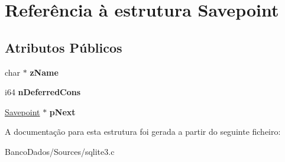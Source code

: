 \hypertarget{struct_savepoint}{\section{Referência à estrutura Savepoint}
\label{struct_savepoint}
}
\subsection*{Atributos Públicos}
\begin{DoxyCompactItemize}
\item 
\hypertarget{struct_savepoint_a0ba08ea77fcfd93099288375e2e9b1ec}{char $\ast$ {\bfseries z\-Name}}\label{struct_savepoint_a0ba08ea77fcfd93099288375e2e9b1ec}

\item 
\hypertarget{struct_savepoint_ae00dd8f725701d9e31da2edbb0b27435}{i64 {\bfseries n\-Deferred\-Cons}}\label{struct_savepoint_ae00dd8f725701d9e31da2edbb0b27435}

\item 
\hypertarget{struct_savepoint_a8d785c3c0eeb6f0c62ea5391892c78cb}{\hyperlink{struct_savepoint}{Savepoint} $\ast$ {\bfseries p\-Next}}\label{struct_savepoint_a8d785c3c0eeb6f0c62ea5391892c78cb}

\end{DoxyCompactItemize}


A documentação para esta estrutura foi gerada a partir do seguinte ficheiro\-:\begin{DoxyCompactItemize}
\item 
Banco\-Dados/\-Sources/sqlite3.\-c\end{DoxyCompactItemize}
